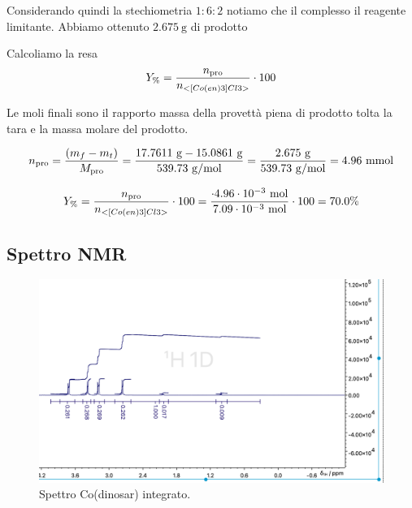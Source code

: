 Considerando quindi la stechiometria $1: 6: 2$ notiamo che il complesso il reagente limitante. Abbiamo ottenuto $ 2.675 \mathrm{~g}$ di prodotto



Calcoliamo la resa 
\[ Y_\% = \frac{n_\text{pro}}{n_{<[Co(en)3]Cl3>}}\cdot 100 \]

Le moli finali sono il rapporto massa della provettà piena di prodotto tolta la tara e la massa molare del prodotto.

\[ n_\text{pro} = \frac{(m_{f} - m_{t})}{M_\text{pro}} 
 = \frac{ 17.7611 \mathrm{\ g} - 15.0861 \mathrm{\ g} }{ 539.73 \mathrm{\ g/mol}} =  \frac{2.675 \mathrm{~g}}{539.73 \mathrm{~g} / \mathrm{mol}}=4.96 \mathrm{\ mmol}\]

\[ Y_\% = \frac{n_\text{pro}}{n_{<[Co(en)3]Cl3>}}\cdot 100  = \frac{ \cdot 4.96 \cdot 10^{-3} \mathrm{~mol}}{7.09 \cdot 10^{-3} \mathrm{~mol}} \cdot 100 =70.0\%\]

\subsection{Spettro NMR}



\begin{figure}
    \centering
    \includegraphics[width=0.8\linewidth]{Relazione/foto/Dinosar_integration_zoom.png}
    \caption{Spettro Co(dinosar) integrato.}
    \label{fig:dinosarint}
\end{figure}



